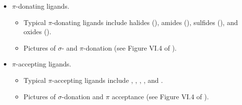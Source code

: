 \documentclass[../notes.tex]{subfiles}
\begin{document}
\begin{itemize}
    \item $\pi$-donating ligands.
    \begin{itemize}
        \item Typical $\pi$-donating ligands include halides (), amides (), sulfides (), and oxides ().
        \item Pictures of $\sigma$- and $\pi$-donation (see Figure VI.4 of \textcite{bib:CHEM20100Notes}).
    \end{itemize}
    \item $\pi$-accepting ligands.
    \begin{itemize}
        \item Typical $\pi$-accepting ligands include , , , , and .
        \item Pictures of $\sigma$-donation and $\pi$ acceptance (see Figure VI.4 of \textcite{bib:CHEM20100Notes}).
    \end{itemize}
\end{itemize}
\end{document}
